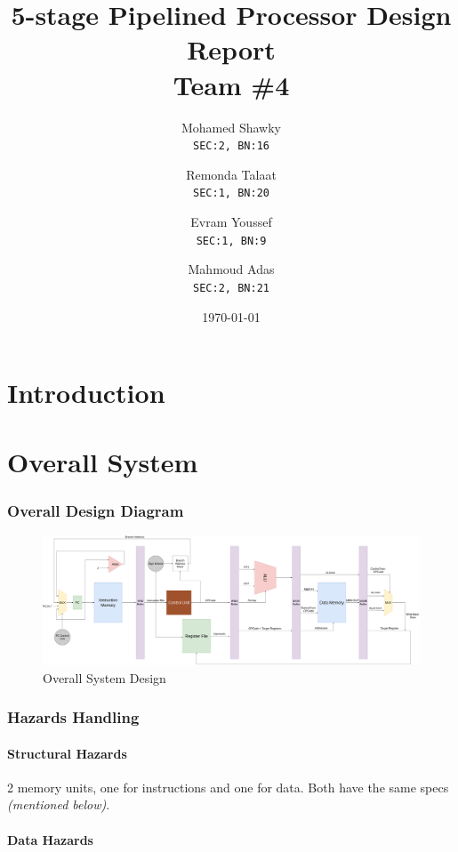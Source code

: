 \documentclass[12pt]{report}
\title{\textbf{5-stage Pipelined Processor Design Report}\\Team \#4}
\author{
  Mohamed Shawky\\
  \small\texttt{SEC:2, BN:16}
  \and
  Remonda Talaat\\
  \small\texttt{SEC:1, BN:20}
  \and
  Evram Youssef\\
  \small\texttt{SEC:1, BN:9}
  \and
  Mahmoud Adas\\
  \small\texttt{SEC:2, BN:21}
}
\date{\today}
\begin{document}
\thispagestyle{empty}

\maketitle
\tableofcontents
\listoffigures
\listoftables
\clearpage


\part{Introduction}

\part{Overall System}

\section{Overall Design Diagram}
\begin{center}
    \begin{figure}[hp]
        \centering
        \includegraphics[width=\textwidth]{overall_system}
        \caption{Overall System Design}
        \label{fig:overall}
    \end{figure}
\end{center}

\section{Hazards Handling}

\subsection{Structural Hazards}
2 memory units, one for instructions and one for data. Both have the same specs \emph{(mentioned below)}.

\subsection{Data Hazards}
\end{document}
